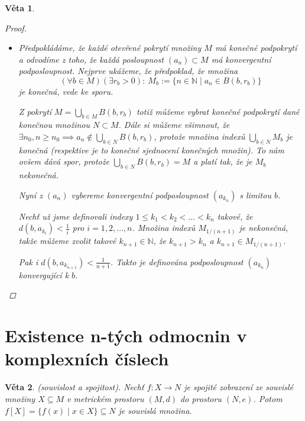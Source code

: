 \documentclass[10pt,a4paper]{article}
\newcommand{\N}{{\mathbb{N}}}       %
\newtheorem*{thm}{Věta}
\begin{document}
\begin{thm}
\begin{proof}
\begin{itemize}
			Vezmeme tak velké $n \in \N$, že $\frac 1{k_n} < \frac r2$ a $d(b, b_{k_n}) < \frac r2$. 
			Pro každé $x \in B(b_{k_n}, 1/k_n)$ pak podle trojúhelníkové nerovnosti máme, že: $$\displaystyle d(x, b) \leq d(x, b_{k_n}) + d(b_{k_n} , b) < \frac r2 + \frac r2 = r.$$
			Z toho vyplývá, že: $$B(b_{k_n} , 1/k_n ) \subset B(b, r) \subset X_j.$$
			To je ovšem ve sporu s vlastností bodů $ b_n $. Tedy pokrytí $ M $ množinami $X_i$, $i \in I$, má konečné podpokrytí.
			
			\item [$\Leftarrow$] Předpokládáme, že každé otevřené pokrytí množiny $M$ má konečné podpokrytí a odvodíme z toho, že každá posloupnost $(a_n) \subset M$ má konvergentní podposloupnost. 
			Nejprve ukážeme, že předpoklad, že množina \[
			(\forall b \in M)(\exists r_b > 0) : ~ M_b := \{n \in \N \mid a_n \in B(b, r_b)\}
			\] je konečná, vede ke sporu.
			
			Z pokrytí $M = \displaystyle \bigcup_{b\in M}B(b, r_b)$ totiž můžeme vybrat konečné podpokrytí dané konečnou množinou $N \subset M$.
			Dále si můžeme všimnout, že $\exists n_0, n \geq n_0 \implies a_n \notin \bigcup_{b\in N}B(b, r_b)$, protože množina indexů $\bigcup_{b\in N}M_b$ je konečná \textit{(respektive je to konečné sjednocení konečných množin)}. 
			To nám ovšem dává spor, protože $\displaystyle \bigcup_{b\in N} B(b,r_b) = M$ a platí tak, že je $M_b$ nekonečná.
			
			Nyní z $(a_n)$ vybereme konvergentní podposloupnost $(a_{k_n})$ s limitou $ b $. 
			
			Nechť už jsme definovali indexy $1 \leq k_1 < k_2 < \ldots < k_n$ takové, že $d(b, a_{k_i} ) < \frac 1i$ pro $i = 1, 2, \ldots , n$. 
			Množina indexů $M_{1/(n+1)}$ je nekonečná, takže můžeme zvolit takové $k_{n+1} \in \N$, že $k_{n+1} > k_n$ a $k_{n+1} \in M_{1/(n+1)}$. 
			
			Pak i $d(b, a_{k_{n+1}} ) < \frac{1}{n + 1}$. Takto je definována podposloupnost $(a_{k_n})$ konvergující k $ b $.
			
		\end{itemize}
	\end{proof}
\end{thm}


\section{Existence n-tých odmocnin v komplexních číslech}

\begin{thm}(souvislost a spojitost). Nechť $f : X \to N$ je spojité zobrazení ze souvislé množiny $X \subseteq M$ v metrickém prostoru $(M, d)$ do prostoru $(N, e)$. Potom $f [X] = \{f (x) \mid x \in X\} \subseteq N$ je souvislá množina.
\end{thm}
\end{document}
